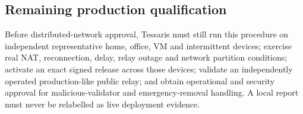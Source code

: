 \subsection{Remaining production qualification}

Before distributed-network approval, Tessaris must still run this procedure on
independent representative home, office, VM and intermittent devices; exercise
real NAT, reconnection, delay, relay outage and network partition conditions;
activate an exact signed release across those devices; validate an
independently operated production-like public relay; and obtain operational and
security approval for malicious-validator and emergency-removal handling.  A
local report must never be relabelled as live deployment evidence.

